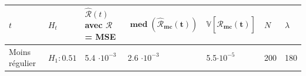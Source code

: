 \begin{table}[H]
	\centering
	\begin{tabularx}{\linewidth}{|X|X|X|X|X|X|X|}
		\toprule
		$t$                                  & $H_t$        & $\widehat{\mathcal R}(t)$ avec $\mathcal R$ = MSE & $\mathbf{\operatorname{med}(\widehat{\mathcal R}_{mc}(t))}$ & $\mathbf{\mathds V[\widehat{\mathcal R}_{mc}(t)]}$ & $N$                       & $\lambda$
		\\
		\midrule
		\multirow{2}{\hsize}{Moins régulier} & $H_1 : 0.51$ & 5.4 $\cdot 10^{-3}$                               & 2.6  $\cdot 10^{-3}$                                        & 5.5$\cdot 10^{-5}$                                 & \multirow{6}{\hsize}{200} & \multirow{6}{\hsize}{180}

\end{tabularx}
\end{table}
